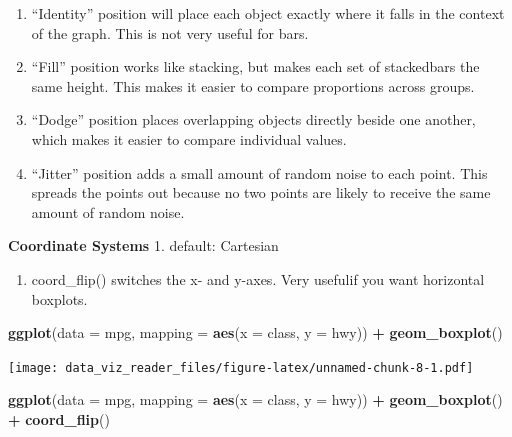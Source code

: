 \documentclass[]{book}
\newenvironment{Shaded}{\begin{snugshade}}{\end{snugshade}}
\newcommand{\KeywordTok}[1]{\textcolor[rgb]{0.13,0.29,0.53}{\textbf{#1}}}
\newcommand{\DataTypeTok}[1]{\textcolor[rgb]{0.13,0.29,0.53}{#1}}
\newcommand{\StringTok}[1]{\textcolor[rgb]{0.31,0.60,0.02}{#1}}
\newcommand{\OperatorTok}[1]{\textcolor[rgb]{0.81,0.36,0.00}{\textbf{#1}}}
\newcommand{\NormalTok}[1]{#1}
\providecommand{\tightlist}{%
  \setlength{\itemsep}{0pt}\setlength{\parskip}{0pt}}
\theoremstyle{definition}
\theoremstyle{definition}
\theoremstyle{definition}
\theoremstyle{remark}
\begin{document}
\begin{enumerate}
\def\labelenumi{\arabic{enumi}.}
\item
  ``Identity'' position will place each object exactly where it falls in
  the context of the graph. This is not very useful for bars.
\item
  ``Fill'' position works like stacking, but makes each set of
  stackedbars the same height. This makes it easier to compare
  proportions across groups.
\item
  ``Dodge'' position places overlapping objects directly beside one
  another, which makes it easier to compare individual values.
\item
  ``Jitter'' position adds a small amount of random noise to each point.
  This spreads the points out because no two points are likely to
  receive the same amount of random noise.
\end{enumerate}

\textbf{Coordinate Systems} 1. default: Cartesian

\begin{enumerate}
\def\labelenumi{\arabic{enumi}.}
\setcounter{enumi}{1}
\tightlist
\item
  coord\_flip() switches the x- and y-axes. Very usefulif you want
  horizontal boxplots.
\end{enumerate}

\begin{Shaded}
\begin{Highlighting}[]
\KeywordTok{ggplot}\NormalTok{(}\DataTypeTok{data =}\NormalTok{ mpg, }\DataTypeTok{mapping =} \KeywordTok{aes}\NormalTok{(}\DataTypeTok{x =}\NormalTok{ class, }\DataTypeTok{y =}\NormalTok{ hwy)) }\OperatorTok{+}\StringTok{ }\KeywordTok{geom_boxplot}\NormalTok{()}
\end{Highlighting}
\end{Shaded}

\texttt{[image: data\_viz\_reader\_files/figure-latex/unnamed-chunk-8-1.pdf]}

\begin{Shaded}
\begin{Highlighting}[]
\KeywordTok{ggplot}\NormalTok{(}\DataTypeTok{data =}\NormalTok{ mpg, }\DataTypeTok{mapping =} \KeywordTok{aes}\NormalTok{(}\DataTypeTok{x =}\NormalTok{ class, }\DataTypeTok{y =}\NormalTok{ hwy)) }\OperatorTok{+}\StringTok{  }\KeywordTok{geom_boxplot}\NormalTok{() }\OperatorTok{+}\StringTok{  }
\StringTok{  }\KeywordTok{coord_flip}\NormalTok{()}
\end{Highlighting}
\end{Shaded}
\end{document}
